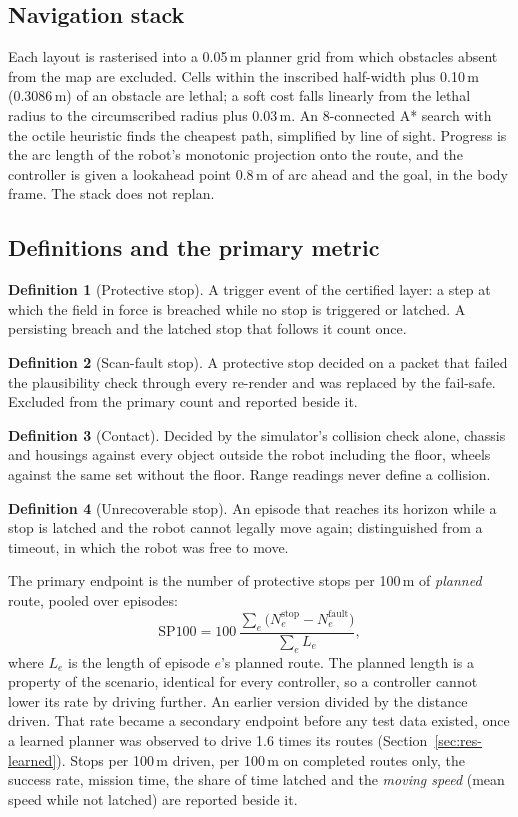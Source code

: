 \documentclass[11pt]{article}
\theoremstyle{definition}
\newtheorem{definition}{Definition}
\begin{document}
\subsection{Navigation stack}
Each layout is rasterised into a 0.05\,m planner grid from which obstacles absent from the map are
excluded. Cells within the inscribed half-width plus 0.10\,m (0.3086\,m) of an obstacle are lethal; a soft
cost falls linearly from the lethal radius to the circumscribed radius plus 0.03\,m. An 8-connected A*
search with the octile heuristic finds the cheapest path, simplified by line of sight. Progress is the
arc length of the robot's monotonic projection onto the route, and the controller is given a lookahead
point 0.8\,m of arc ahead and the goal, in the body frame. The stack does not replan.

\subsection{Definitions and the primary metric}\label{sec:defs}
\begin{definition}[Protective stop]
A trigger event of the certified layer: a step at which the field in force is breached while no stop is
triggered or latched. A persisting breach and the latched stop that follows it count once.
\end{definition}
\begin{definition}[Scan-fault stop]
A protective stop decided on a packet that failed the plausibility check through every re-render and was
replaced by the fail-safe. Excluded from the primary count and reported beside it.
\end{definition}
\begin{definition}[Contact]
Decided by the simulator's collision check alone, chassis and housings against every object outside the
robot including the floor, wheels against the same set without the floor. Range readings never define a
collision.
\end{definition}
\begin{definition}[Unrecoverable stop]
An episode that reaches its horizon while a stop is latched and the robot cannot legally move again;
distinguished from a timeout, in which the robot was free to move.
\end{definition}

The primary endpoint is the number of protective stops per 100\,m of \emph{planned} route, pooled over
episodes:
\begin{equation}
\mathrm{SP100}=100\,\frac{\sum_e\big(N^{\mathrm{stop}}_e-N^{\mathrm{fault}}_e\big)}{\sum_e L_e},
\label{eq:sp100}
\end{equation}
where $L_e$ is the length of episode $e$'s planned route. The planned length is a property of the
scenario, identical for every controller, so a controller cannot lower its rate by driving further. An earlier version divided by the distance driven. That rate became a secondary endpoint before any test data existed, once a learned planner was observed to drive 1.6 times its routes (Section~\ref{sec:res-learned}). Stops per 100\,m driven, per 100\,m on completed routes only, the success
rate, mission time, the share of time latched and the \emph{moving speed} (mean speed while not latched)
are reported beside it.
\end{document}

